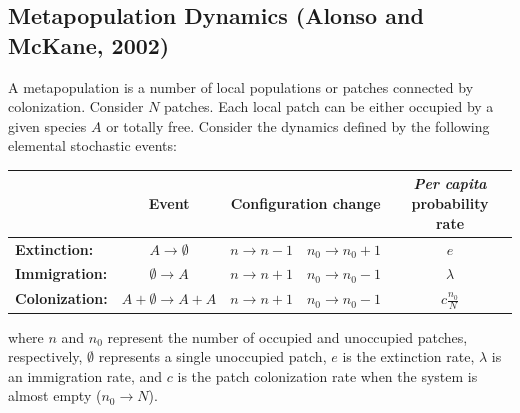 \subsection{Metapopulation Dynamics (Alonso and McKane, 2002)}
A metapopulation is a number of local populations or patches connected by colonization\cite{Alonso02,Levins69}. Consider $N$ patches. Each local patch can be either occupied by a given species $A$ or totally free.  Consider the dynamics defined by the following elemental stochastic events: 
\begin{center}
\begin{tabular}{ l c c c  c }                   
          & Event                          & \multicolumn{2}{c}{Configuration change}  &  {\em Per capita} probability rate \\ 
\hline
{\bf Extinction:}  & $A  \longrightarrow \emptyset$ &  $n \longrightarrow n - 1$ & $n_0 \longrightarrow n_0 + 1$  &  $e$ \\

{\bf Immigration:}  & $\emptyset \longrightarrow A$  &  $n \longrightarrow n + 1$ & $n_0 \longrightarrow n_0 - 1 $ &  $\lambda$ \\

{\bf Colonization:}  & $A + \emptyset \longrightarrow A + A$ & $n \longrightarrow n + 1$ & $n_0 \longrightarrow n_0 - 1$  &  $c\frac{n_0}{N}$ \\
\end{tabular}
\end{center}
where $n$ and $n_0$ represent the number of occupied and unoccupied patches, respectively, $\emptyset$ represents a single unoccupied patch, $e$ is the extinction rate, $\lambda$ is an immigration rate, and $c$ is the patch colonization rate when the system is almost empty ($n_0 \rightarrow N$).
